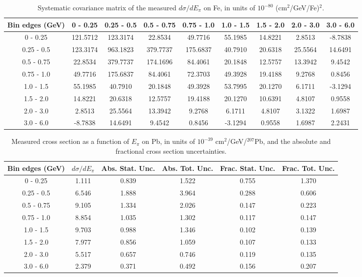 \documentclass[aps,prl,twocolumn,superscriptaddress,nofootinbib]{revtex4-1}
\begin{document}
\begin{table}[h!]
  \centering
  \caption{Systematic covariance matrix of the measured $d\sigma/dE_{\pi}$ on Fe, in units of $10^{-80}$ (cm$^{2}$/GeV/Fe)$^{2}$.}
    \begin{tabular}{c||cccccccc}
      Bin edges (GeV) & 0 - 0.25 & 0.25 - 0.5 & 0.5 - 0.75 & 0.75 - 1.0 & 1.0 - 1.5 & 1.5 - 2.0 & 2.0 - 3.0 & 3.0 - 6.0 \\
\hline \hline
        0 - 0.25 & 121.5712 & 123.3174 & 22.8534 & 49.7716 & 55.1985 & 14.8221 &  2.8513 & -8.7838 \\
      0.25 - 0.5 & 123.3174 & 963.1823 & 379.7737 & 175.6837 & 40.7910 & 20.6318 & 25.5564 & 14.6491 \\
      0.5 - 0.75 & 22.8534 & 379.7737 & 174.1696 & 84.4061 & 20.1848 & 12.5757 & 13.3942 &  9.4542 \\
      0.75 - 1.0 & 49.7716 & 175.6837 & 84.4061 & 72.3703 & 49.3928 & 19.4188 &  9.2768 &  0.8456 \\
       1.0 - 1.5 & 55.1985 & 40.7910 & 20.1848 & 49.3928 & 53.7995 & 20.1270 &  6.1711 & -3.1294 \\
       1.5 - 2.0 & 14.8221 & 20.6318 & 12.5757 & 19.4188 & 20.1270 & 10.6391 &  4.8107 &  0.9558 \\
       2.0 - 3.0 &  2.8513 & 25.5564 & 13.3942 &  9.2768 &  6.1711 &  4.8107 &  3.1322 &  1.6987 \\
       3.0 - 6.0 & -8.7838 & 14.6491 &  9.4542 &  0.8456 & -3.1294 &  0.9558 &  1.6987 &  2.2431 \\
    \end{tabular}
  \label{tablecov:Fe_Systematic_Epi}
\end{table}

\begin{table}[h!]
  \centering
  \caption{Measured cross section as a function of $E_{\pi}$ on Pb, in units of
  $10^{-39}$ $\text{cm}^{2}$/GeV/$^{207}$Pb, and the absolute and
  fractional cross section uncertainties.}
    \begin{tabular}{c||c||c|c||c|c}
      Bin edges (GeV)  &  $d\sigma/dE_{\pi}$  &  Abs. Stat. Unc. & Abs. Tot. Unc.  &  Frac. Stat. Unc.  &  Frac. Tot. Unc. \\
      \hline\hline
        0 - 0.25 & 1.111 & 0.839 & 1.522 & 0.755 & 1.370 \\
      0.25 - 0.5 & 6.546 & 1.888 & 3.964 & 0.288 & 0.606 \\
      0.5 - 0.75 & 9.105 & 1.334 & 2.026 & 0.147 & 0.223 \\
      0.75 - 1.0 & 8.854 & 1.035 & 1.302 & 0.117 & 0.147 \\
       1.0 - 1.5 & 9.703 & 0.988 & 1.346 & 0.102 & 0.139 \\
       1.5 - 2.0 & 7.977 & 0.856 & 1.059 & 0.107 & 0.133 \\
       2.0 - 3.0 & 5.517 & 0.657 & 0.746 & 0.119 & 0.135 \\
       3.0 - 6.0 & 2.379 & 0.371 & 0.492 & 0.156 & 0.207 \\
    \end{tabular}
  \label{table:EpiXSec_Pb}
\end{table}
\end{document}
